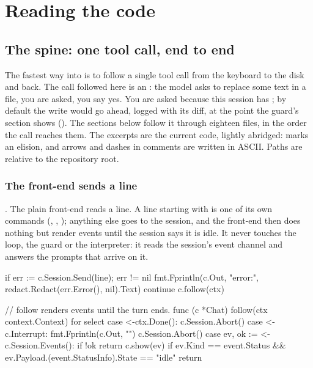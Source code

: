 \part{Reading the code}

\chapter{The spine: one tool call, end to end}

The fastest way into \nodwyn{} is to follow a single tool call from the
keyboard to the disk and back. The call followed here is an :
the model asks to replace some text in a file, you are asked, you say yes.
You are asked because this session has ; by
default the write would go ahead, logged with its diff, at the point the
guard's section shows (). The sections below follow it through
eighteen files, in the order the call reaches them. The excerpts are the current code, lightly abridged:
 marks an elision, and arrows and dashes in comments are
written in ASCII. Paths are relative to the repository root.

\section{The front-end sends a line}

. The plain front-end reads a line.
A line starting with \code{:} is one of its own commands (,
, ); anything else goes to the session, and the
front-end then does nothing but render events until the session says it
is idle. It never touches the loop, the guard or the interpreter: it reads
the session's event channel and answers the prompts that arrive on it.

\begin{go}
if err := c.Session.Send(line); err != nil {
    fmt.Fprintln(c.Out, "error:", redact.Redact(err.Error(), nil).Text)
    continue
}
c.follow(ctx)

// follow renders events until the turn ends.
func (c *Chat) follow(ctx context.Context) {
    for {
        select {
        case <-ctx.Done():
            c.Session.Abort()
        case <-c.Interrupt:
            fmt.Fprintln(c.Out, "\n[aborting]")
            c.Session.Abort()
        case ev, ok := <-c.Session.Events():
            if !ok {
                return
            }
            c.show(ev)
            if ev.Kind == event.Status && ev.Payload.(event.StatusInfo).State == "idle" {
                return
            }
        }
    }
}
\end{go}

